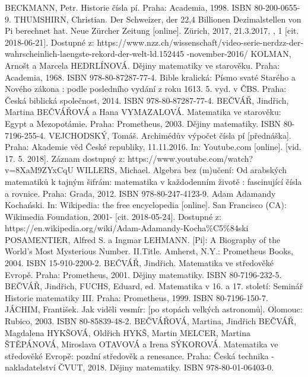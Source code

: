 \documentclass[soc]{gzwroc} %
\begin{document}
\newpage
\begin{oldthebibliography}{99}
BECKMANN, Petr. Historie čísla pí. Praha: Academia, 1998. ISBN 80-200-0655-9.
THUMSHIRN, Christian. Der Schweizer, der 22,4 Billionen Dezimalstellen von Pi berechnet hat. Neue Zürcher Zeitung [online]. Zürich, 2017, 21.3.2017, , 1 [cit. 2018-06-21]. Dostupné z: https://www.nzz.ch/wissenschaft/video-serie-nerdzz-der-wahrscheinlich-laengste-rekord-der-welt-ld.152445
-november-2016/
KOLMAN, Arnošt a Marcela HEDRLÍNOVÁ. Dějiny matematiky ve starověku. Praha: Academia, 1968. ISBN 978-80-87287-77-4.
Bible kralická: Písmo svaté Starého a Nového zákona : podle posledního vydání z roku 1613. 5. vyd. v ČBS. Praha: Česká biblická společnost, 2014. ISBN 978-80-87287-77-4.
BEČVÁŘ, Jindřich, Martina BEČVÁŘOVÁ a Hana VYMAZALOVÁ. Matematika ve starověku: Egypt a Mezopotámie. Praha: Prometheus, 2003. Dějiny matematiky. ISBN 80-7196-255-4.
VEJCHODSKÝ, Tomáš. Archimédův výpočet čísla pí [přednáška]. Praha: Akademie věd České republiky, 11.11.2016. In: Youtube.com [online]. [vid. 17. 5. 2018]. Záznam dostupný z: https://www.youtube.com/watch?v=8XaM9ZYxCqU
WILLERS, Michael. Algebra bez (m)učení: Od arabských matematiků k tajným šifrám: matematika v každodenním životě : fascinující čísla a rovnice. Praha: Grada, 2012. ISBN 978-80-247-4123-9.
Adam Adamandy Kochański. In: Wikipedia: the free encyclopedia [online]. San Francisco (CA): Wikimedia Foundation, 2001- [cit. 2018-05-24]. Dostupné z: https://en.wikipedia.org/wiki/Adam-Adamandy-Kocha\%C5\%84ski
POSAMENTIER, Alfred S. a Ingmar LEHMANN. [Pi]: A Biography of the World's Most Mysterious Number. II.Title. Amherst, N.Y.: Prometheus Books, 2004. ISBN 15-910-2200-2.
BEČVÁŘ, Jindřich. Matematika ve středověké Evropě. Praha: Prometheus, 2001. Dějiny matematiky. ISBN 80-7196-232-5.
BEČVÁŘ, Jindřich, FUCHS, Eduard, ed. Matematika v 16. a 17. století: Seminář Historie matematiky III. Praha: Prometheus, 1999. ISBN 80-7196-150-7.
JÁCHIM, František. Jak viděli vesmír: [po stopách velkých astronomů]. Olomouc: Rubico, 2003. ISBN 80-85839-48-2.
BEČVÁŘOVÁ, Martina, Jindřich BEČVÁŘ, Magdalena HYKŠOVÁ, Oldřich HYKŠ, Martin MELCER, Martina ŠTĚPÁNOVÁ, Miroslava OTAVOVÁ a Irena SÝKOROVÁ. Matematika ve středověké Evropě: pozdní středověk a renesance. Praha: Česká technika - nakladatelství ČVUT, 2018. Dějiny matematiky. ISBN 978-80-01-06403-0.

\end{oldthebibliography}
\end{document}

